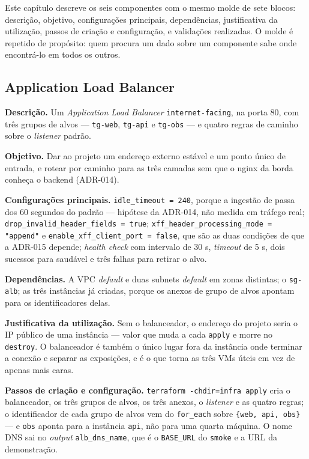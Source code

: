 \documentclass[11pt,a4paper]{article}
\begin{document}
Este capítulo descreve os seis componentes com o mesmo molde de sete blocos: descrição, objetivo,
configurações principais, dependências, justificativa da utilização, passos de criação e
configuração, e validações realizadas. O molde é repetido de propósito: quem procura um dado sobre
um componente sabe onde encontrá-lo em todos os outros.

\subsection{Application Load Balancer}

\textbf{Descrição.} Um \emph{Application Load Balancer} \texttt{internet-facing}, na porta 80, com
três grupos de alvos --- \texttt{tg-web}, \texttt{tg-api} e \texttt{tg-obs} --- e quatro regras de
caminho sobre o \emph{listener} padrão.

\textbf{Objetivo.} Dar ao projeto um endereço externo estável e um ponto único de entrada, e
rotear por caminho para as três camadas sem que o nginx da borda conheça o backend (ADR-014).

\textbf{Configurações principais.} \texttt{idle\_timeout = 240}, porque a ingestão de
 passa dos 60 segundos do padrão --- hipótese da ADR-014, não medida em
tráfego real; \texttt{drop\_\allowbreak{}invalid\_\allowbreak{}header\_\allowbreak{}fields =
true}; \texttt{xff\_\allowbreak{}header\_\allowbreak{}processing\_\allowbreak{}mode = "append"} e \texttt{enable\_\allowbreak{}xff\_\allowbreak{}client\_\allowbreak{}port =
false}, que são as duas condições de que a ADR-015 depende; \emph{health check} com intervalo de
30 s, \emph{timeout} de 5 s, dois sucessos para saudável e três falhas para retirar o alvo.

\textbf{Dependências.} A VPC \emph{default} e duas subnets \emph{default} em zonas distintas; o
\texttt{sg-alb}; as três instâncias já criadas, porque os anexos de grupo de alvos apontam para os
identificadores delas.

\textbf{Justificativa da utilização.} Sem o balanceador, o endereço do projeto seria o IP público de
uma instância --- valor que muda a cada \texttt{apply} e morre no \texttt{destroy}. O balanceador é
também o único lugar fora da instância onde terminar a conexão e separar as exposições, e é o que
torna as três VMs úteis em vez de apenas mais caras.

\textbf{Passos de criação e configuração.} \texttt{terraform -chdir=infra apply} cria o balanceador,
os três grupos de alvos, os três anexos, o \emph{listener} e as quatro regras; o identificador de
cada grupo de alvos vem do \texttt{for\_each} sobre \texttt{\{web, api, obs\}} --- e \texttt{obs}
aponta para a instância \texttt{api}, não para uma quarta máquina. O nome DNS sai no
\emph{output} \texttt{alb\_dns\_name}, que é o \texttt{BASE\_URL} do \texttt{smoke} e a URL da
demonstração.
\end{document}
